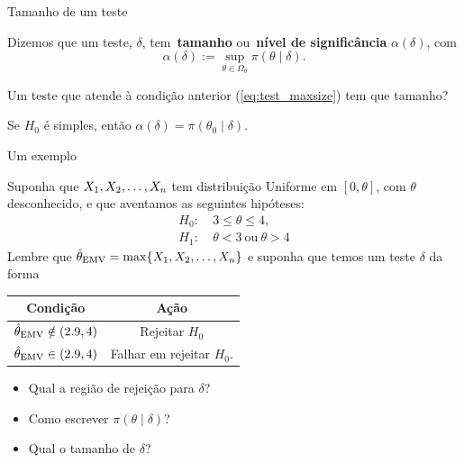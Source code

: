  
\begin{frame}{Tamanho de um teste}
 \begin{defn}
 \label{def:size_test}
 Dizemos que um teste, $\delta$, tem~\textbf{tamanho} ou~\textbf{nível de significância} $\alpha(\delta)$, com 
 \begin{equation*}
  \alpha(\delta) := \sup_{\theta \in \Omega_0} \pi(\theta \mid \delta).
 \end{equation*}
 \end{defn}
Um teste que atende à condição anterior (\ref{eq:test_maxsize}) tem que tamanho?

\begin{obs}
 Se $H_0$ é simples, então $\alpha(\delta) = \pi(\theta_0 \mid \delta)$.
\end{obs}

\end{frame}

\begin{frame}{Um exemplo}
 \begin{exemplo}
 \label{ex:test_uniform_parameter}
  Suponha que $X_1, X_2, \ldots, X_n$ tem distribuição Uniforme em $[0, \theta]$, com $\theta$ desconhecido, e que aventamos as seguintes hipóteses:
  \begin{align*}
   H_0:&\: 3 \leq \theta \leq 4, \\
   H_1:&\:  \theta < 3 \:\text{ou}\: \theta > 4
  \end{align*}
  Lembre que $\hat{\theta}_{\text{EMV}} = \max\{X_1, X_2, \ldots, X_n\}$ e suponha que temos um teste $\delta$ da forma  
   \begin{center}
  \begin{tabular}{cc}
   Condição & Ação \\
   \hline
   $\hat{\theta}_{\text{EMV}} \notin (2.9, 4)$ & Rejeitar $H_0$ \\
   $\hat{\theta}_{\text{EMV}} \in (2.9, 4)$ & Falhar em rejeitar $H_0$.\\
   \hline
  \end{tabular}
 \end{center}  
 \end{exemplo}
\begin{itemize}
 \item Qual a região de rejeição para $\delta$?
 \item Como escrever $\pi(\theta \mid \delta)$?
 \item Qual o tamanho de $\delta$?
\end{itemize}
\end{frame}

